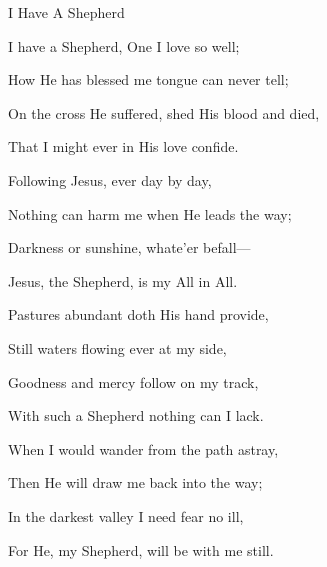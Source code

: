 \documentclass[12pt]{book}
\begin{document}
\begin{song}{I Have A Shepherd}{}
  {\SBPubDom}
  {}
  {}
  {}

  \begin{SBVerse}
    I have a Shepherd, One I love so well;

    How He has blessed me tongue can never tell;

    On the cross He suffered, shed His blood and died,

    That I might ever in His love confide.
  \end{SBVerse}

  \begin{SBOpGroup}
    Following Jesus, ever day by day,

    Nothing can harm me when He leads the way;

    Darkness or sunshine, whate'er befall---

    Jesus, the Shepherd, is my All in All.
  \end{SBOpGroup}

  \begin{SBVerse}
    Pastures abundant doth His hand provide,

    Still waters flowing ever at my side,

    Goodness and mercy follow on my track,

    With such a Shepherd nothing can I lack.
  \end{SBVerse}

  \begin{SBVerse}
    When I would wander from the path astray,

    Then He will draw me back into the way;

    In the darkest valley I need fear no ill,

    For He, my Shepherd, will be with me still.
  \end{SBVerse}
\end{song}
\end{document}
